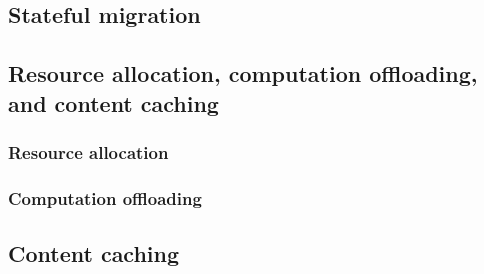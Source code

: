 \subsection{Stateful migration}



\subsection{Resource allocation, computation offloading, and content caching}


\subsubsection{Resource allocation}

\subsubsection{Computation offloading}


\subsection{Content caching}



